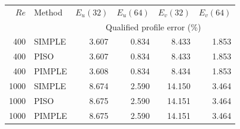 \begin{center}\small
\begin{tabular}{rlrrrr}\toprule
$Re$ & Method & $E_u(32)$ & $E_u(64)$ & $E_v(32)$ & $E_v(64)$\\
 & & \multicolumn{4}{c}{Qualified profile error (\%)}\\\midrule
400 & SIMPLE & 3.607 & 0.834 & 8.433 & 1.853\\
400 & PISO & 3.607 & 0.834 & 8.433 & 1.853\\
400 & PIMPLE & 3.608 & 0.834 & 8.434 & 1.853\\
1000 & SIMPLE & 8.674 & 2.590 & 14.150 & 3.464\\
1000 & PISO & 8.675 & 2.590 & 14.151 & 3.464\\
1000 & PIMPLE & 8.675 & 2.590 & 14.151 & 3.464\\
\bottomrule\end{tabular}\end{center}
